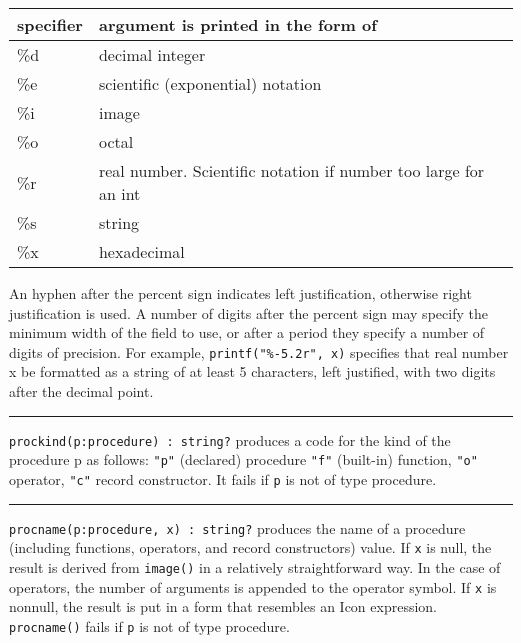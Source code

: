 \begin{center}
\begin{xtabular}{m{0.5in} m{4.5in}}
specifier & argument is printed in the form of \\ \hline
   \%d    & decimal integer \\
   \%e    & scientific (exponential) notation \\
   \%i    & image \\
   \%o    & octal \\
   \%r    & real number. Scientific notation if number too large for an int \\
   \%s    & string \\
   \%x    & hexadecimal
\end{xtabular}
\end{center}

An hyphen after the percent sign indicates left justification,
otherwise right justification is used. A number of digits after the
percent sign may specify the minimum width of the field to use, or after
a period they specify a number of digits of precision. For example,
\texttt{printf("\%-5.2r", x)} specifies that real number x be
formatted as a string of at least 5 characters, left justified,
with two digits after the decimal point.


\vspace{0.25cm}\hrule{}

\texttt{prockind(p:procedure) : string?} produces a code for the kind of
the procedure p as follows: \texttt{"p"}
(declared) procedure \texttt{"f"}
(built-in) function, \texttt{"o"} operator,
\texttt{"c"} record
constructor. It fails if \texttt{p} is not of type
procedure. 

\vspace{0.25cm}\hrule{}

\texttt{procname(p:procedure, x) : string?} produces the name of a
procedure (including functions, operators, and record
constructors) value. If \texttt{x} is null,
the result is derived from \texttt{image()} in a relatively
straightforward way. In the case of operators, the number of arguments
is appended to the operator symbol. If \texttt{x} is nonnull, the
result is put in a form that resembles an Icon expression.
\texttt{procname()} fails if \texttt{p} is not of type procedure. 

